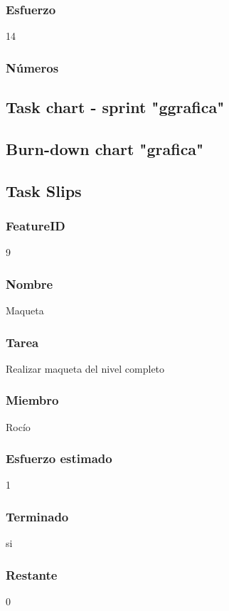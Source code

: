 \subsubsection{Esfuerzo}
14
\subsubsection{Números}



\subsection{Task chart - sprint "ggrafica"}



\subsection{Burn-down chart "grafica"}


\subsection{Task Slips}


\subsubsection{FeatureID}9
\subsubsection{Nombre}Maqueta
\subsubsection{Tarea}Realizar maqueta del nivel completo
\subsubsection{Miembro}Rocío
\subsubsection{Esfuerzo estimado}1
\subsubsection{Terminado}si
\subsubsection{Restante}0


